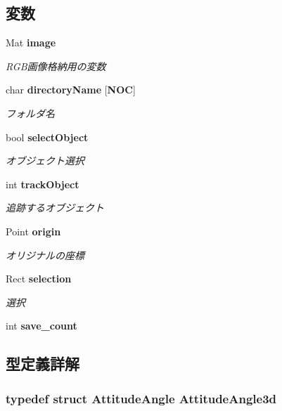 \subsection*{変数}
\begin{DoxyCompactItemize}
\item 
Mat {\bf image}
\begin{DoxyCompactList}\small\item\em R\-G\-B画像格納用の変数 \end{DoxyCompactList}\item 
char {\bf directory\-Name} [{\bf N\-O\-C}]
\begin{DoxyCompactList}\small\item\em フォルダ名 \end{DoxyCompactList}\item 
bool {\bf select\-Object}
\begin{DoxyCompactList}\small\item\em オブジェクト選択 \end{DoxyCompactList}\item 
int {\bf track\-Object}
\begin{DoxyCompactList}\small\item\em 追跡するオブジェクト \end{DoxyCompactList}\item 
Point {\bf origin}
\begin{DoxyCompactList}\small\item\em オリジナルの座標 \end{DoxyCompactList}\item 
Rect {\bf selection}
\begin{DoxyCompactList}\small\item\em 選択 \end{DoxyCompactList}\item 
int {\bf save\-\_\-count}
\end{DoxyCompactItemize}


\subsection{型定義詳解}
\subsubsection[{Attitude\-Angle3d}]{\setlength{\rightskip}{0pt plus 5cm}typedef struct {\bf Attitude\-Angle} {\bf Attitude\-Angle3d}}\label{_path_tracking_and_induction_of_the_robot_8hpp_a4860903646946a52474a935518d26b08}
